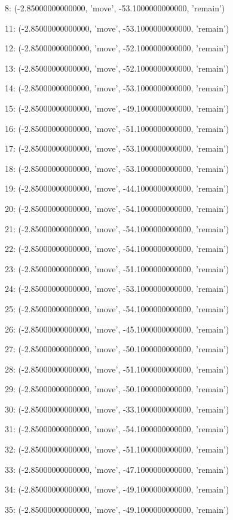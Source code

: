 8: (-2.85000000000000, 'move', -53.1000000000000, 'remain')


11: (-2.85000000000000, 'move', -53.1000000000000, 'remain')


12: (-2.85000000000000, 'move', -52.1000000000000, 'remain')


13: (-2.85000000000000, 'move', -52.1000000000000, 'remain')


14: (-2.85000000000000, 'move', -53.1000000000000, 'remain')


15: (-2.85000000000000, 'move', -49.1000000000000, 'remain')


16: (-2.85000000000000, 'move', -51.1000000000000, 'remain')


17: (-2.85000000000000, 'move', -53.1000000000000, 'remain')


18: (-2.85000000000000, 'move', -53.1000000000000, 'remain')


19: (-2.85000000000000, 'move', -44.1000000000000, 'remain')


20: (-2.85000000000000, 'move', -54.1000000000000, 'remain')


21: (-2.85000000000000, 'move', -54.1000000000000, 'remain')


22: (-2.85000000000000, 'move', -54.1000000000000, 'remain')


23: (-2.85000000000000, 'move', -51.1000000000000, 'remain')


24: (-2.85000000000000, 'move', -53.1000000000000, 'remain')


25: (-2.85000000000000, 'move', -54.1000000000000, 'remain')


26: (-2.85000000000000, 'move', -45.1000000000000, 'remain')


27: (-2.85000000000000, 'move', -50.1000000000000, 'remain')


28: (-2.85000000000000, 'move', -51.1000000000000, 'remain')


29: (-2.85000000000000, 'move', -50.1000000000000, 'remain')


30: (-2.85000000000000, 'move', -33.1000000000000, 'remain')


31: (-2.85000000000000, 'move', -54.1000000000000, 'remain')


32: (-2.85000000000000, 'move', -51.1000000000000, 'remain')


33: (-2.85000000000000, 'move', -47.1000000000000, 'remain')


34: (-2.85000000000000, 'move', -49.1000000000000, 'remain')


35: (-2.85000000000000, 'move', -49.1000000000000, 'remain')


